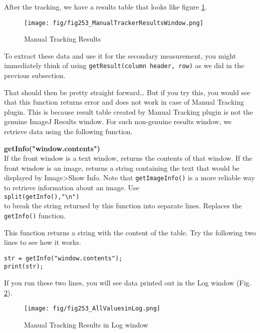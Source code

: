 \documentclass[11pt,a4paper,oneside]{report}
\newenvironment{indentCom}%
{\begin{list}{}%
         {\setlength{\leftmargin}{1em}}%
         \item[]%
}
{\end{list}}
\newcommand{\ilcom}[1]{\texttt{\small#1}}
\begin{document}
After the tracking, we have a results table that looks like figure \ref{fig:manualtrackingresults}.
\begin{figure}[htbp]
\begin{center}
\texttt{[image: fig/fig253\_ManualTrackerResultsWindow.png]}
\caption{Manual Tracking Results}
\label{fig:manualtrackingresults}
\end{center}
\end{figure}

To extract these data and use it for the secondary measurement, 
you might immediately think of using \ilcom{getResult(column header, row)} 
as we did in the previous subsection.

That should then be pretty straight forward\ldots 
But if you try this, you would see that this function returns error and 
does not work in case of Manual Tracking plugin. 
This is because result table created by Manual Tracking plugin is not the genuine ImageJ Results window. 
For such non-genuine results window, we retrieve data using the following function. 
\begin{indentCom}
\textbf{getInfo("window.contents")}\\
If the front window is a text window, returns the contents of that window. 
If the front window is an image, returns a string containing the text that would be displayed by 
Image>Show Info. Note that \ilcom{getImageInfo()} is a more reliable way to retrieve information 
about an image. Use \\
\ilcom{split(getInfo(),"\textbackslash{}n")} \\
to break the string returned by this function into separate lines. Replaces the \ilcom{getInfo()} function.
\end{indentCom}

This function returns a string with the content of the table. 
Try the following two lines to see how it works. \\

\begin{lstlisting}[numbers=none, morekeywords={*, getInfo}]
str = getInfo("window.contents");
print(str);
\end{lstlisting}
If you run these two lines, you will see data printed out in the Log window 
(Fig. \ref{fig:manualtrackingresultsLog}). 
\begin{figure}[htbp]
\begin{center}
\texttt{[image: fig/fig253\_AllValuesinLog.png]}
\caption{Manual Tracking Results in Log window}
\label{fig:manualtrackingresultsLog}
\end{center}
\end{figure}
\end{document}
